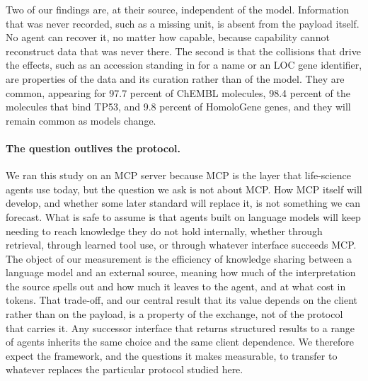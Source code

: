 \documentclass[sigconf]{ceurart}
\begin{document}
Two of our findings are, at their source, independent of the model. Information
that was never recorded, such as a missing unit, is absent from the payload itself.
No agent can recover it, no matter how capable, because capability cannot
reconstruct data that was never there. The second is that the collisions that drive
the effects, such as an accession standing in for a name or an LOC gene identifier,
are properties of the data and its curation rather than of the model. They are common, appearing for 97.7 percent of ChEMBL molecules,
98.4 percent of the molecules that bind TP53, and 9.8 percent of HomoloGene genes,
and they will remain common as models change.

\paragraph{The question outlives the protocol.}
We ran this study on an MCP server because MCP is the layer that life-science
agents use today, but the question we ask is not about MCP. How MCP itself will
develop, and whether some later standard will replace it, is not something we can
forecast. What is safe to assume is that agents built on language models will keep
needing to reach knowledge they do not hold internally, whether through retrieval,
through learned tool use, or through whatever interface succeeds MCP. The object of
our measurement is the efficiency of knowledge sharing between a language model and
an external source, meaning how much of the interpretation the source spells out
and how much it leaves to the agent, and at what cost in tokens. That trade-off,
and our central result that its value depends on the client rather than on the
payload, is a property of the exchange, not of the protocol that carries it. Any
successor interface that returns structured results to a range of agents inherits
the same choice and the same client dependence. We therefore expect the framework,
and the questions it makes measurable, to transfer to whatever replaces the
particular protocol studied here.
\end{document}
